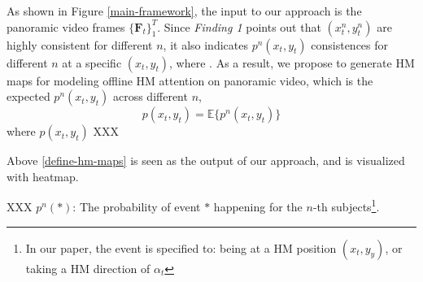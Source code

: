 \documentclass[10pt,journal,compsoc]{IEEEtran}
\begin{document}
As shown in Figure \ref{main-framework}, the input to our approach is the panoramic video frames $\{\mathbf{F}_t\}_1^{T}$.
Since \textit{Finding 1} points out that $(x^n_t, y^n_t)$ are highly consistent for different $n$, it also indicates $p^n(x_t,y_t)$ consistences for different $n$ at a specific $(x_t,y_t)$, where . As a result, we propose to generate HM maps for modeling offline HM attention on panoramic video, which is the expected $p^n(x_t,y_t)$ across different $n$,
 \begin{equation}\label{define-hm-maps}
   p(x_t,y_t) = \mathbb{E}\{ p^n(x_t, y_t) \}
 \end{equation}
where $p(x_t,y_t)$ XXX

 Above \eqref{define-hm-maps} is seen as the output of our approach, and is visualized with heatmap.

XXX $p^n(\ast)$: The probability of event $\ast$ happening for the $n$-th subjects\footnote{In our paper, the event is specified to: being at a HM position $(x_t,y_y)$, or taking a HM direction of $\alpha_t$}.
\end{document}
